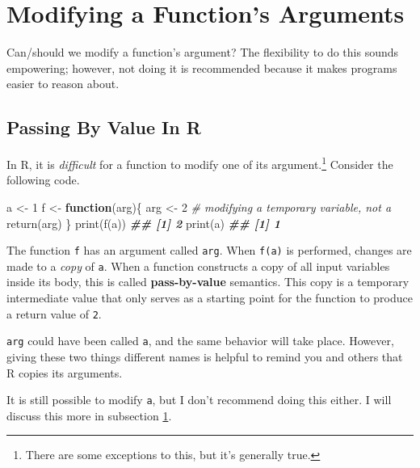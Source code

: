 \documentclass[
  12pt,
]{krantz}
\makeatletter
\newenvironment{Shaded}{\begin{snugshade}}{\end{snugshade}}
\newcommand{\CommentTok}[1]{\textcolor[rgb]{0.37,0.37,0.37}{\textit{#1}}}
\newcommand{\ControlFlowTok}[1]{\textcolor[rgb]{0.27,0.27,0.27}{\textbf{#1}}}
\newcommand{\DecValTok}[1]{\textcolor[rgb]{0.06,0.06,0.06}{#1}}
\newcommand{\DocumentationTok}[1]{\textcolor[rgb]{0.37,0.37,0.37}{\textbf{\textit{#1}}}}
\newcommand{\FunctionTok}[1]{\textcolor[rgb]{0,0,0}{#1}}
\newcommand{\NormalTok}[1]{#1}
\newcommand{\OtherTok}[1]{\textcolor[rgb]{0.37,0.37,0.37}{#1}}
\newenvironment{kframe}{%
\medskip{}
\setlength{\fboxsep}{.8em}
 \def\at@end@of@kframe{}%
 \ifinner\ifhmode%
  \def\at@end@of@kframe{\end{minipage}}%
  \begin{minipage}{\columnwidth}%
 \fi\fi%
 \def\FrameCommand##1{\hskip\@totalleftmargin \hskip-\fboxsep
 \colorbox{shadecolor}{##1}\hskip-\fboxsep
     \hskip-\linewidth \hskip-\@totalleftmargin \hskip\columnwidth}%
 \MakeFramed {\advance\hsize-\width
   \@totalleftmargin\z@ \linewidth\hsize
   \@setminipage}}%
 {\par\unskip\endMakeFramed%
 \at@end@of@kframe}
\renewenvironment{Shaded}{\begin{kframe}}{\end{kframe}}
\makeatother
\begin{document}
\hypertarget{modifying-a-functions-arguments}{%
\section{Modifying a Function's Arguments}\label{modifying-a-functions-arguments}}

Can/should we modify a function's argument? The flexibility to do this sounds empowering; however, not doing it is recommended because it makes programs easier to reason about.

\hypertarget{passing-by-value-in-r}{%
\subsection{Passing By Value In R}\label{passing-by-value-in-r}}

In R, it is \emph{difficult} for a function to modify one of its argument.\footnote{There are some exceptions to this, but it's generally true.} Consider the following code.

\begin{Shaded}
\begin{Highlighting}[]
\NormalTok{a }\OtherTok{\textless{}{-}} \DecValTok{1}
\NormalTok{f }\OtherTok{\textless{}{-}} \ControlFlowTok{function}\NormalTok{(arg)\{}
\NormalTok{  arg }\OtherTok{\textless{}{-}} \DecValTok{2} \CommentTok{\# modifying a temporary variable, not a}
  \FunctionTok{return}\NormalTok{(arg)}
\NormalTok{\}}
\FunctionTok{print}\NormalTok{(}\FunctionTok{f}\NormalTok{(a))}
\DocumentationTok{\#\# [1] 2}
\FunctionTok{print}\NormalTok{(a)}
\DocumentationTok{\#\# [1] 1}
\end{Highlighting}
\end{Shaded}

The function \texttt{f} has an argument called \texttt{arg}. When \texttt{f(a)} is performed, changes are made to a \emph{copy} of \texttt{a}. When a function constructs a copy of all input variables inside its body, this is called \textbf{pass-by-value} semantics. This copy is a temporary intermediate value that only serves as a starting point for the function to produce a return value of \texttt{2}.

\texttt{arg} could have been called \texttt{a}, and the same behavior will take place. However, giving these two things different names is helpful to remind you and others that R copies its arguments.

It is still possible to modify \texttt{a}, but I don't recommend doing this either. I will discuss this more in subsection \ref{modifying-a-functions-arguments}.
\end{document}
